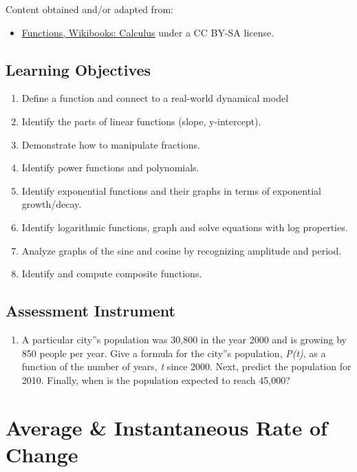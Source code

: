 Content obtained and/or adapted from:
\begin{itemize}
    \item \href{https://en.wikibooks.org/wiki/Calculus/Functions}{Functions, Wikibooks: Calculus} under a CC BY-SA license.
\end{itemize}

\subsection{Learning Objectives}

\begin{enumerate}
    \item Define a function and connect to a real-world dynamical model
    \item Identify the parts of linear functions (slope, y-intercept).
    \item Demonstrate how to manipulate fractions.
    \item Identify power functions and polynomials.
    \item Identify exponential functions and their graphs in terms of exponential growth/decay.
    \item Identify logarithmic functions, graph and solve equations with log properties.
    \item Analyze graphs of the sine and cosine by recognizing amplitude and period.
    \item Identify and compute composite functions.
\end{enumerate}

\subsection{Assessment Instrument}

\begin{enumerate}
    \item A particular city''s population was 30,800 in the year 2000 and is growing by 850 people per year.  Give a formula for the city''s population, \textit{P(t)}, as a function of the number of years, \textit{t} since 2000. Next, predict the population for 2010. Finally, when is the population expected to reach 45,000?
\end{enumerate}

\section{Average \& Instantaneous Rate of Change}
\label{sec:average-instantaneous-rate-of-change}

